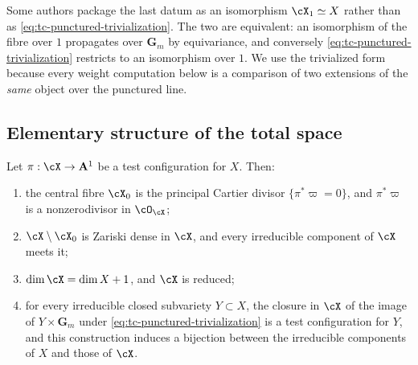 Some authors package the last datum as an isomorphism
$\cX_1\simeq X$ rather than as
\eqref{eq:tc-punctured-trivialization}.  The two are equivalent: an
isomorphism of the fibre over $1$ propagates over
$\mathbf G_m$ by equivariance, and conversely
\eqref{eq:tc-punctured-trivialization} restricts to an isomorphism over
$1$.  We use the trivialized form because every weight computation below
is a comparison of two extensions of the \emph{same} object over the
punctured line.

\subsection{Elementary structure of the total space}
\label{sec:ch33-tc-structure}

\begin{lemma}\label{lem:ch33-central-fibre-cartier}
Let $\pi:\cX\to\mathbf A^1$ be a test configuration for $X$.  Then:
\begin{enumerate}
\item the central fibre $\cX_0$ is the principal Cartier divisor
 $\{\pi^\ast\varpi=0\}$, and $\pi^\ast\varpi$ is a nonzerodivisor in
 $\cO_{\cX}$;
\item $\cX\setminus\cX_0$ is Zariski dense in $\cX$, and every
 irreducible component of $\cX$ meets it;
\item $\dim\cX=\dim X+1$, and $\cX$ is reduced;
\item for every irreducible closed subvariety $Y\subset X$, the closure
 in $\cX$ of the image of $Y\times\mathbf G_m$ under
 \eqref{eq:tc-punctured-trivialization} is a test configuration for $Y$,
 and this construction induces a bijection between the irreducible
 components of $X$ and those of $\cX$.
\end{enumerate}
\end{lemma}


